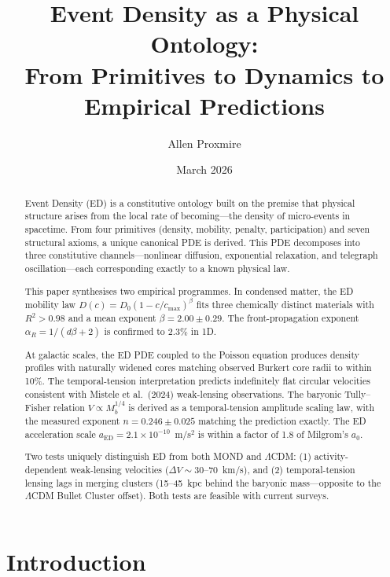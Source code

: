 \documentclass[12pt,letterpaper]{article}
\title{\textbf{Event Density as a Physical Ontology:\\[4pt] From Primitives to Dynamics to Empirical Predictions}}
\author{Allen Proxmire}
\date{March 2026}
\begin{document}
\maketitle
\thispagestyle{empty}

\begin{abstract}
\noindent
Event Density (ED) is a constitutive ontology built on the premise that physical structure arises from the local rate of becoming---the density of micro-events in spacetime. From four primitives (density, mobility, penalty, participation) and seven structural axioms, a unique canonical PDE is derived. This PDE decomposes into three constitutive channels---nonlinear diffusion, exponential relaxation, and telegraph oscillation---each corresponding exactly to a known physical law.

This paper synthesises two empirical programmes. In condensed matter, the ED mobility law $D(c) = D_0(1-c/c_{\max})^\beta$ fits three chemically distinct materials with $R^2 > 0.98$ and a mean exponent $\beta = 2.00 \pm 0.29$. The front-propagation exponent $\alpha_R = 1/(d\beta+2)$ is confirmed to 2.3\% in 1D.

At galactic scales, the ED PDE coupled to the Poisson equation produces density profiles with naturally widened cores matching observed Burkert core radii to within 10\%. The temporal-tension interpretation predicts indefinitely flat circular velocities consistent with Mistele et al.\ (2024) weak-lensing observations. The baryonic Tully--Fisher relation $V \propto M_b^{1/4}$ is derived as a temporal-tension amplitude scaling law, with the measured exponent $n = 0.246 \pm 0.025$ matching the prediction exactly. The ED acceleration scale $a_{\mathrm{ED}} = 2.1 \times 10^{-10}$~m/s$^2$ is within a factor of 1.8 of Milgrom's $a_0$.

Two tests uniquely distinguish ED from both MOND and $\Lambda$CDM: (1) activity-dependent weak-lensing velocities ($\Delta V \sim 30$--70~km/s), and (2) temporal-tension lensing lags in merging clusters (15--45~kpc behind the baryonic mass---opposite to the $\Lambda$CDM Bullet Cluster offset). Both tests are feasible with current surveys.
\end{abstract}

\newpage
\tableofcontents
\newpage

\section{Introduction}
\end{document}
